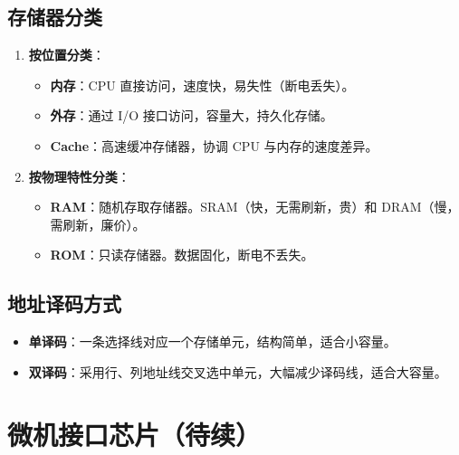 \documentclass[12pt,a4paper]{ctexart}
\begin{document}
\subsection{存储器分类}
\begin{enumerate}
    \item \textbf{按位置分类}：
    \begin{itemize}
        \item \textbf{内存}：CPU 直接访问，速度快，易失性（断电丢失）。
        \item \textbf{外存}：通过 I/O 接口访问，容量大，持久化存储。
        \item \textbf{Cache}：高速缓冲存储器，协调 CPU 与内存的速度差异。
    \end{itemize}
    \item \textbf{按物理特性分类}：
    \begin{itemize}
        \item \textbf{RAM}：随机存取存储器。SRAM（快，无需刷新，贵）和 DRAM（慢，需刷新，廉价）。
        \item \textbf{ROM}：只读存储器。数据固化，断电不丢失。
    \end{itemize}
\end{enumerate}

\subsection{地址译码方式}
\begin{itemize}
    \item \textbf{单译码}：一条选择线对应一个存储单元，结构简单，适合小容量。
    \item \textbf{双译码}：采用行、列地址线交叉选中单元，大幅减少译码线，适合大容量。
\end{itemize}

\section{微机接口芯片（待续）}
\end{document}
